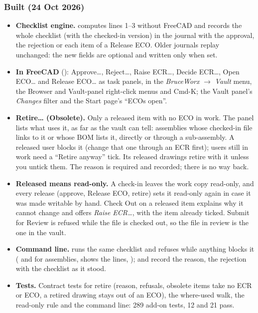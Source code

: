 \subsubsection*{Built (24 Oct 2026)}
\begin{itemize}[nosep]
  \item \textbf{Checklist engine.}  computes lines 1--3 without FreeCAD and records the
        whole checklist (with the checked-in version) in the journal with the approval, the rejection or each item of a
        Release ECO. Older journals replay unchanged: the new fields are optional and written only when set.
  \item \textbf{In FreeCAD} (): Approve\ldots, Reject\ldots, Raise ECR\ldots, Decide ECR\ldots,
        Open ECO\ldots{} and Release ECO\ldots{} as task panels, in the \emph{BruceWorx} $\rightarrow$ \emph{Vault} menu, the
        Browser and Vault-panel right-click menus and Cmd-K; the Vault panel's \emph{Changes} filter and the Start page's
        ``ECOs open''.
  \item \textbf{Retire\ldots{} (Obsolete).} Only a released item with no ECO in work. The panel lists what uses it, as far
        as the vault can tell: assemblies whose checked-in file links to it or whose BOM lists it, directly or through a
        sub-assembly. A released user blocks it (change that one through an ECR first); users still in work need a
        ``Retire anyway'' tick. Its released drawings retire with it unless you untick them. The reason is required and
        recorded; there is no way back.
  \item \textbf{Released means read-only.} A check-in leaves the work copy read-only, and every release (approve, Release
        ECO, retire) sets it read-only again in case it was made writable by hand. Check Out on a released item explains
        why it cannot change and offers \emph{Raise ECR\ldots}, with the item already ticked. Submit for Review is refused
        while the file is checked out, so the file in review is the one in the vault.
  \item \textbf{Command line.}  runs the same checklist and refuses while
        anything blocks it ( and  for assemblies,  shows the lines,
        );  and  record the reason,
        the rejection with the checklist as it stood.
  \item \textbf{Tests.} Contract tests for retire (reason, refusals, obsolete items take no ECR or ECO, a retired drawing
        stays out of an ECO), the where-used walk, the read-only rule and the command line: 289 add-on tests,
         12 and  21 pass.
\end{itemize}

